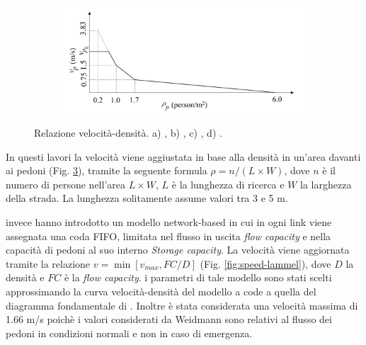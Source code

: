 \begin{figure}[ht]
\begin{subfigure}{0.45\textwidth}
        \caption{}
        \label{fig:speed-goto}
    \end{subfigure}
    \hfill
    \begin{subfigure}{0.45\textwidth}
        \includegraphics[width=\textwidth]{images/speed_WANG.png}
        \caption{}
        \label{fig:speed-wang}
    \end{subfigure}
    \caption{Relazione velocità-densità.
        a) \textcite[]{lammel2010emergency},
        b) \textcite[]{takabatake2017simulated},
        c) \textcite[]{goto2012tsunami},
        d) \textcite[]{wang2021novel}.
    }
    \label{fig:speeds}
\end{figure}

In questi lavori la velocità viene aggiustata in base alla densità in un'area davanti ai pedoni (Fig. \ref{fig:speeds}), tramite la seguente formula
$\rho = n /(L \times W)$, dove $n$ è il numero di persone nell'area $L \times W$, $L$ è la lunghezza di ricerca e $W$ la larghezza della strada.
%
La lunghezza solitamente assume valori tra 3 e 5 m.

\textcite{lammel2010emergency} invece hanno introdotto un modello network-based in cui in ogni link viene assegnata una coda FIFO,
limitata nel flusso in uscita \textit{flow capacity} e nella capacità di pedoni al suo interno \textit{Storage capacity}.
La velocità viene aggiornata tramite la relazione $v = \min[v_{max}, FC / D]$ (Fig. \ref{fig:speed-lammel}),
dove $D$ la densità e $FC$ è la \textit{flow capacity}.
i parametri di tale modello sono stati scelti approssimando la curva velocità-densità del modello a code a quella
del diagramma fondamentale di \textcite{weidmann1993transporttechnik}.
Inoltre è stata considerata una velocità massima di 1.66 m/s poichè i valori considerati da Weidmann sono relativi
al flusso dei pedoni in condizioni normali e non in caso di emergenza.


